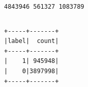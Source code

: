 \documentclass[11pt]{article}
\begin{document}
    \begin{Verbatim}[commandchars=\\\{\}]

    \end{Verbatim}

    \begin{Verbatim}[commandchars=\\\{\}]
4843946 561327 1083789
    \end{Verbatim}

    \begin{Verbatim}[commandchars=\\\{\}]

    \end{Verbatim}

    \begin{Verbatim}[commandchars=\\\{\}]
+-----+-------+
|label|  count|
+-----+-------+
|    1| 945948|
|    0|3897998|
+-----+-------+

    \end{Verbatim}
\end{document}
